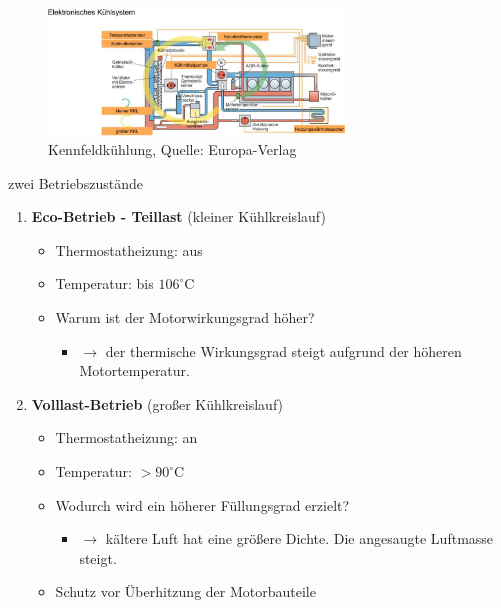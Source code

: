 \begin{figure}[!ht]%
\centering
\includegraphics[width=0.7\textwidth]{images/Kuehlsystem/Kuehlsystem-1.pdf}
\caption{Kennfeldkühlung, Quelle: Europa-Verlag}
\end{figure}

zwei Betriebszustände

\begin{enumerate}
\item
  \textbf{Eco-Betrieb - Teillast} (kleiner Kühlkreislauf)

  \begin{itemize}
  \item
    Thermostatheizung: aus
  \item
    Temperatur: bis $106^\circ\text{C}$
  \item
    Warum ist der Motorwirkungsgrad höher?

    \begin{itemize}
    \item
      $\to$ der thermische Wirkungsgrad steigt aufgrund der höheren
      Motortemperatur.
    \end{itemize}
  \end{itemize}
\item
  \textbf{Volllast-Betrieb} (großer Kühlkreislauf)

  \begin{itemize}
  \item
    Thermostatheizung: an
  \item
    Temperatur: $> 90^\circ\text{C}$
  \item
    Wodurch wird ein höherer Füllungsgrad erzielt?

    \begin{itemize}
    \item
      $\to$ kältere Luft hat eine größere Dichte. Die angesaugte
      Luftmasse steigt.
    \end{itemize}
  \item
    Schutz vor Überhitzung der Motorbauteile
  \end{itemize}
\end{enumerate}

